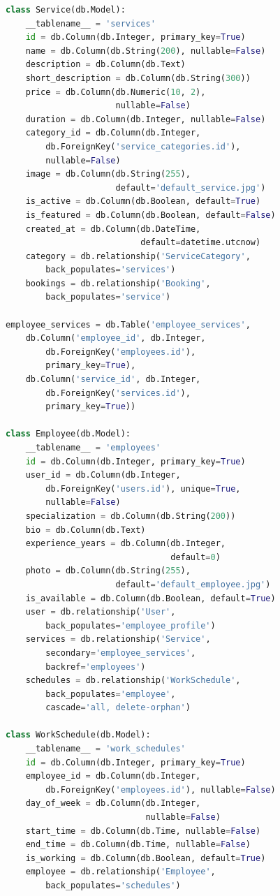 \documentclass[14pt,a4paper,oneside]{extarticle}
\begin{document}
\begin{lstlisting}[language=Python, caption={Полный код моделей базы данных (app/models.py)}, label={lst:full_models}]
class Service(db.Model):
    __tablename__ = 'services'
    id = db.Column(db.Integer, primary_key=True)
    name = db.Column(db.String(200), nullable=False)
    description = db.Column(db.Text)
    short_description = db.Column(db.String(300))
    price = db.Column(db.Numeric(10, 2),
                      nullable=False)
    duration = db.Column(db.Integer, nullable=False)
    category_id = db.Column(db.Integer,
        db.ForeignKey('service_categories.id'),
        nullable=False)
    image = db.Column(db.String(255),
                      default='default_service.jpg')
    is_active = db.Column(db.Boolean, default=True)
    is_featured = db.Column(db.Boolean, default=False)
    created_at = db.Column(db.DateTime,
                           default=datetime.utcnow)
    category = db.relationship('ServiceCategory',
        back_populates='services')
    bookings = db.relationship('Booking',
        back_populates='service')

employee_services = db.Table('employee_services',
    db.Column('employee_id', db.Integer,
        db.ForeignKey('employees.id'),
        primary_key=True),
    db.Column('service_id', db.Integer,
        db.ForeignKey('services.id'),
        primary_key=True))

class Employee(db.Model):
    __tablename__ = 'employees'
    id = db.Column(db.Integer, primary_key=True)
    user_id = db.Column(db.Integer,
        db.ForeignKey('users.id'), unique=True,
        nullable=False)
    specialization = db.Column(db.String(200))
    bio = db.Column(db.Text)
    experience_years = db.Column(db.Integer,
                                 default=0)
    photo = db.Column(db.String(255),
                      default='default_employee.jpg')
    is_available = db.Column(db.Boolean, default=True)
    user = db.relationship('User',
        back_populates='employee_profile')
    services = db.relationship('Service',
        secondary='employee_services',
        backref='employees')
    schedules = db.relationship('WorkSchedule',
        back_populates='employee',
        cascade='all, delete-orphan')

class WorkSchedule(db.Model):
    __tablename__ = 'work_schedules'
    id = db.Column(db.Integer, primary_key=True)
    employee_id = db.Column(db.Integer,
        db.ForeignKey('employees.id'), nullable=False)
    day_of_week = db.Column(db.Integer,
                            nullable=False)
    start_time = db.Column(db.Time, nullable=False)
    end_time = db.Column(db.Time, nullable=False)
    is_working = db.Column(db.Boolean, default=True)
    employee = db.relationship('Employee',
        back_populates='schedules')


\end{lstlisting}
\end{document}
